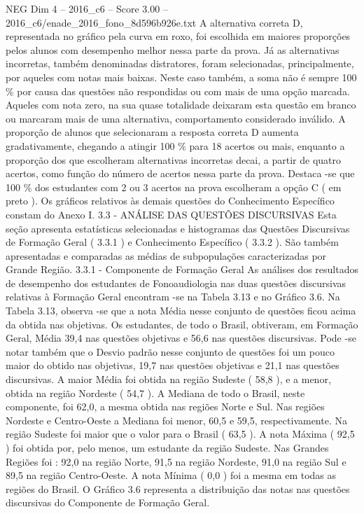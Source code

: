\begin{textsample}{NEG Dim 4 – 2016\_c6 – Score 3.00 – 2016\_c6/enade\_2016\_fono\_8d596b926e.txt}
A alternativa correta D, representada no gráfico pela curva em roxo, foi escolhida em maiores proporções pelos alunos com desempenho melhor nessa parte da prova.
Já as alternativas incorretas, também denominadas distratores, foram selecionadas, principalmente, por aqueles com notas mais baixas.
Neste caso também, a soma não é sempre 100 \% por causa das questões não respondidas ou com mais de uma opção marcada.
Aqueles com nota zero, na sua quase totalidade deixaram esta questão em branco ou marcaram mais de uma alternativa, comportamento considerado inválido.
A proporção de alunos que selecionaram a resposta correta D aumenta gradativamente, chegando a atingir 100 \% para 18 acertos ou mais, enquanto a proporção dos que escolheram alternativas incorretas decai, a partir de quatro acertos, como função do número de acertos nessa parte da prova.
Destaca -se que 100 \% dos estudantes com 2 ou 3 acertos na prova escolheram a opção C ( em preto ).
Os gráficos relativos às demais questões do Conhecimento Específico constam do Anexo I. 3.3 - ANÁLISE DAS QUESTÕES DISCURSIVAS Esta seção apresenta estatísticas selecionadas e histogramas das Questões Discursivas de Formação Geral ( 3.3.1 ) e Conhecimento Específico ( 3.3.2 ).
São também apresentadas e comparadas as médias de subpopulações caracterizadas por Grande Região. 3.3.1 - Componente de Formação Geral As análises dos resultados de desempenho dos estudantes de Fonoaudiologia nas duas questões discursivas relativas à Formação Geral encontram -se na Tabela 3.13 e no Gráfico 3.6.
Na Tabela 3.13, observa -se que a nota Média nesse conjunto de questões ficou acima da obtida nas objetivas.
Os estudantes, de todo o Brasil, obtiveram, em Formação Geral, Média 39,4 nas questões objetivas e 56,6 nas questões discursivas.
Pode -se notar também que o Desvio padrão nesse conjunto de questões foi um pouco maior do obtido nas objetivas, 19,7 nas questões objetivas e 21,1 nas questões discursivas.
A maior Média foi obtida na região Sudeste ( 58,8 ), e a menor, obtida na região Nordeste ( 54,7 ).
A Mediana de todo o Brasil, neste componente, foi 62,0, a mesma obtida nas regiões Norte e Sul.
Nas regiões Nordeste e Centro-Oeste a Mediana foi menor, 60,5 e 59,5, respectivamente.
Na região Sudeste foi maior que o valor para o Brasil ( 63,5 ).
A nota Máxima ( 92,5 ) foi obtida por, pelo menos, um estudante da região Sudeste.
Nas Grandes Regiões foi : 92,0 na região Norte, 91,5 na região Nordeste, 91,0 na região Sul e 89,5 na região Centro-Oeste.
A nota Mínima ( 0,0 ) foi a mesma em todas as regiões do Brasil.
O Gráfico 3.6 representa a distribuição das notas nas questões discursivas do Componente de Formação Geral.

\end{textsample}
